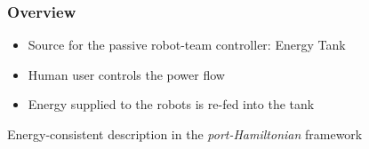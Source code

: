 \documentclass[student]{ITRslides}
\begin{document}
\begin{frame}
	\frametitle{Overview}
	
	\begin{figure}
		\centering
		\def\svgwidth{0.99\columnwidth}
		
	\end{figure}
	\begin{itemize}
		\item Source for the passive robot-team controller: Energy Tank
		\item Human user controls the power flow
		\item Energy supplied to the robots is re-fed into the tank
	\end{itemize}
	\begin{block}{}
		Energy-consistent description in the \emph{port-Hamiltonian} framework
		\end{block}
	
\end{frame}
\end{document}
